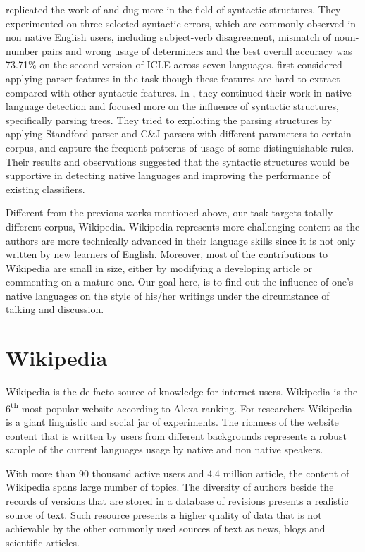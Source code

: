 \documentclass[10pt,a5paper,twoside]{article}
\begin{document}
\cite{wong2009contrastive} replicated the work of \cite {koppel2005automatically}
and dug more in the field of syntactic structures.
They experimented on three selected syntactic errors, which are commonly
observed in non native English users, including subject-verb disagreement,
mismatch of noun-number pairs and wrong usage of determiners and the best
overall accuracy was 73.71\% on the second version of ICLE across seven
languages. \cite{wong2010parser} first considered applying parser features in
the task though these features are hard to extract compared with other
syntactic features. In \cite{wong-dras:2011:EMNLP}, they continued their
work in native language detection and focused more on the influence of
syntactic structures, specifically parsing trees. They tried to exploiting the
parsing structures by applying Standford parser and C\&J parsers with different
parameters to certain corpus, and capture the frequent patterns of usage of some
distinguishable rules. Their results and observations suggested that the
syntactic structures would be supportive in detecting native languages and
improving the performance of existing classifiers.

Different from the previous works mentioned above, our task targets totally
different corpus, Wikipedia. Wikipedia represents more challenging content as the
authors are more technically advanced in their language skills since it is not only written by
new learners of English. Moreover, most of the contributions to Wikipedia are
small in size, either by modifying a developing article or commenting on
a mature one. Our goal here, is to find out the influence of one's native
languages on the style of his/her writings under the circumstance of talking and
discussion.

\section{Wikipedia}
\label{wiki}
Wikipedia is the de facto source of knowledge for internet users. Wikipedia is
the 6\textsuperscript{th} most popular website according to Alexa ranking.
For researchers Wikipedia is a giant linguistic and social jar of experiments.
The richness of the website content that is written by users from different backgrounds represents a robust sample of the current languages usage by native and non native speakers.

With more than 90 thousand active users and 4.4 million article, the content of Wikipedia spans large number of topics. The diversity of authors beside the records of versions that are stored in a database of revisions presents a realistic source of text. Such resource presents a higher quality of data that is not achievable by the other commonly used sources of text as news, blogs and scientific articles.
\end{document}
